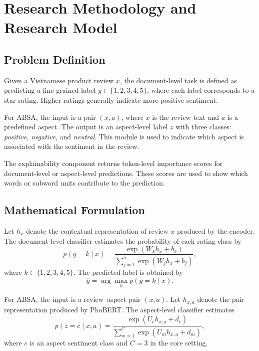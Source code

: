 \documentclass[a4paper,12pt]{extarticle}
\begin{document}
\section{Research Methodology and Research Model}

\subsection{Problem Definition}

Given a Vietnamese product review $x$, the document-level task is defined as predicting a fine-grained label $y \in \{1,2,3,4,5\}$, where each label corresponds to a star rating. Higher ratings generally indicate more positive sentiment.

For ABSA, the input is a pair $(x, a)$, where $x$ is the review text and $a$ is a predefined aspect. The output is an aspect-level label $z$ with three classes: \textit{positive}, \textit{negative}, and \textit{neutral}. This module is used to indicate which aspect is associated with the sentiment in the review.

The explainability component returns token-level importance scores for document-level or aspect-level predictions. These scores are used to show which words or subword units contribute to the prediction.

\subsection{Mathematical Formulation}

Let $h_x$ denote the contextual representation of review $x$ produced by the encoder. The document-level classifier estimates the probability of each rating class by
\begin{equation}
p(y = k \mid x) = \frac{\exp\left(W_k h_x + b_k\right)}
{\sum_{j=1}^{5} \exp\left(W_j h_x + b_j\right)},
\end{equation}
where $k \in \{1,2,3,4,5\}$. The predicted label is obtained by
\begin{equation}
\hat{y} = \arg\max_k p(y = k \mid x).
\end{equation}

For ABSA, the input is a review--aspect pair $(x,a)$. Let $h_{x,a}$ denote the pair representation produced by PhoBERT. The aspect-level classifier estimates
\begin{equation}
p(z = c \mid x, a) = \frac{\exp\left(U_c h_{x,a} + d_c\right)}
{\sum_{m=1}^{C} \exp\left(U_m h_{x,a} + d_m\right)},
\end{equation}
where $c$ is an aspect sentiment class and $C=3$ in the core setting.
\end{document}
